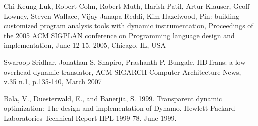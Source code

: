 \documentclass[11pt,twoside]{article}
\begin{document}
\begin{thebibliography}{99}

Chi-Keung Luk, Robert Cohn, Robert Muth, Harish Patil, Artur
Klauser, Geoff Lowney, Steven Wallace, Vijay Janapa Reddi, Kim Hazelwood, 
Pin: building customized program analysis tools with dynamic instrumentation, 
Proceedings of the 2005 ACM SIGPLAN conference on Programming language design
and implementation, June 12-15, 2005, Chicago, IL, USA 

Swaroop Sridhar, Jonathan S. Shapiro, Prashanth P. Bungale, 
HDTrans: a low-overhead dynamic translator, ACM SIGARCH Computer Architecture
News, v.35 n.1, p.135-140, March 2007 

Bala, V., Duesterwald, E., and Banerjia, S. 1999. Transparent
dynamic optimization: The design and implementation of Dynamo. Hewlett Packard
Laboratories Technical Report HPL-1999-78. June 1999. 

\end{thebibliography}
\end{document}
